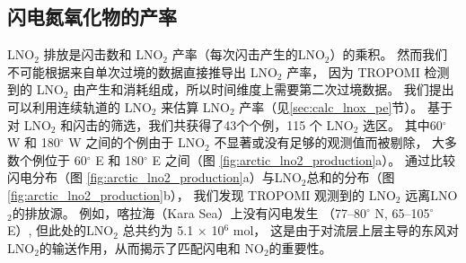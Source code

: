 \subsection{闪电氮氧化物的产率}

LNO$_2$ 排放是闪击数和 LNO$_2$ 产率（每次闪击产生的LNO$_2$）的乘积。
然而我们不可能根据来自单次过境的数据直接推导出 LNO$_2$ 产率，
因为 TROPOMI 检测到的 LNO$_2$ 由产生和消耗组成，所以时间维度上需要第二次过境数据。
我们提出可以利用连续轨道的 LNO$_2$ 来估算 LNO$_2$ 产率（见\ref{sec:calc_lnox_pe}节）。
基于对 LNO$_2$ 和闪击的筛选，我们共获得了43个个例，115 个 LNO$_2$ 选区。
其中60$^{\circ}$ W 和 180$^{\circ}$ W 之间的个例由于 LNO$_2$ 不显著或没有足够的观测值而被剔除，
大多数个例位于 60$^{\circ}$ E 和 180$^{\circ}$ E 之间（图 \ref{fig:arctic_lno2_production}a）。
通过比较闪电分布（图 \ref{fig:arctic_lno2_production}a）与LNO$_2$总和的分布（图 \ref{fig:arctic_lno2_production}b），
我们发现 TROPOMI 观测到的 LNO$_2$ 远离LNO$_2$的排放源。
例如，喀拉海（Kara Sea）上没有闪电发生 （77--80$^{\circ}$ N, 65--105$^{\circ}$ E）,
但此处的LNO$_2$ 总共约为 5.1 $\times$ 10$^6$ mol，
这是由于对流层上层主导的东风对LNO$_2$的输送作用，从而揭示了匹配闪电和 NO$_2$的重要性。


